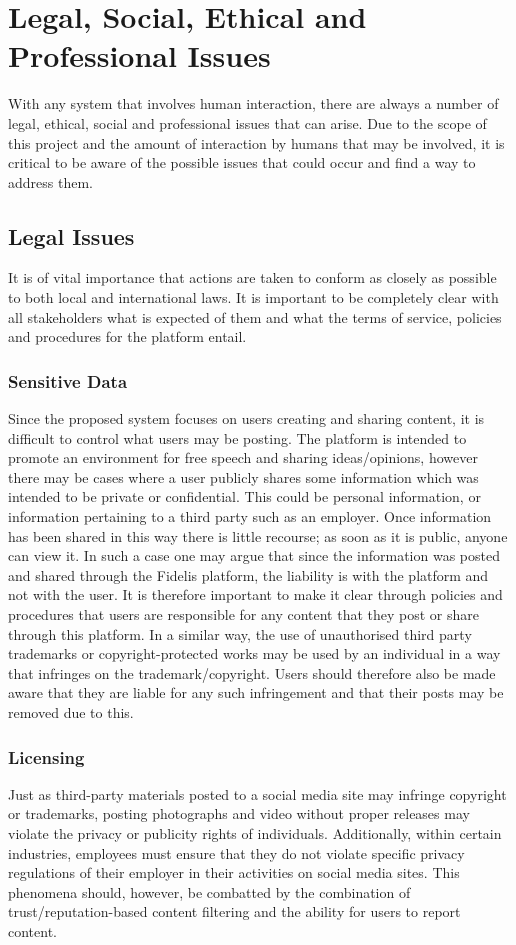 \chapter{Legal, Social, Ethical and Professional Issues}
\label{Chapter:Issues}
With any system that involves human interaction, there are always a number of legal, ethical, social and professional issues that can arise. Due to the scope of this project and the amount of interaction by humans that may be involved, it is critical to be aware of the possible issues that could occur and find a way to address them.

\section{Legal Issues}
It is of vital importance that actions are taken to conform as closely as possible to both local and international laws. It is important to be completely clear with all stakeholders what is expected of them and what the terms of service, policies and procedures for the platform entail.

\subsection{Sensitive Data}
Since the proposed system focuses on users creating and sharing content, it is difficult to control what users may be posting. The platform is intended to promote an environment for free speech and sharing ideas/opinions, however there may be cases where a user publicly shares some information which was intended to be private or confidential. This could be personal information, or information pertaining to a third party such as an employer. Once information has been shared in this way there is little recourse; as soon as it is public, anyone can view it. In such a case one may argue that since the information was posted and shared through the Fidelis platform, the liability is with the platform and not with the user. It is therefore important to make it clear through policies and procedures that users are responsible for any content that they post or share through this platform. In a similar way, the use of unauthorised third party trademarks or copyright-protected works may be used by an individual in a way that infringes on the trademark/copyright. Users should therefore also be made aware that they are liable for any such infringement and that their posts may be removed due to this.

\subsection{Licensing}
Just as third-party materials posted to a social media site may infringe copyright or trademarks, posting photographs and video without proper releases may violate the privacy or publicity rights of individuals. Additionally, within certain industries, employees must ensure that they do not violate specific privacy regulations of their employer in their activities on social media sites. This phenomena should, however, be combatted by the combination of trust/reputation-based content filtering and the ability for users to report content.

